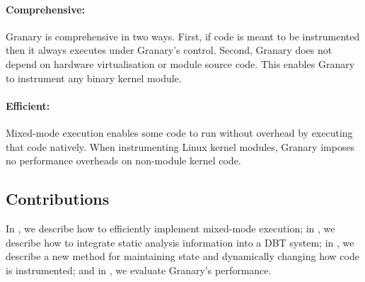 \documentclass[preprint]{sigplanconf}
\begin{document}

%

\paragraph{Comprehensive:} Granary is comprehensive in two ways. First, if code is meant to be instrumented then it always executes under Granary's control. Second, Granary does not depend on hardware virtualisation or module source code. This enables Granary to instrument any binary kernel module.

\paragraph{Efficient:} Mixed-mode execution enables some code to run without overhead by executing that code natively. When instrumenting Linux kernel modules, Granary imposes no performance overheads on non-module kernel code.


\subsection{Contributions}\label{sec:contrib}
In , we describe how to efficiently implement mixed-mode execution; in , we describe how to integrate static analysis information into a DBT system; in , we describe a new method for maintaining state and dynamically changing how code is instrumented; and in , we evaluate Granary's performance.
\end{document}
